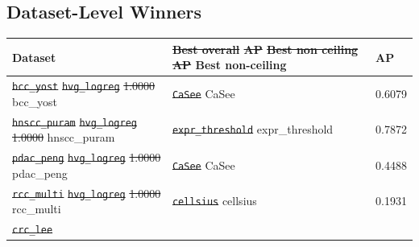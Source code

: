 \documentclass[10pt]{article}
\providecommand{\DIFaddtex}[1]{{\protect\color{trackgreen}#1}} %
\providecommand{\DIFdeltex}[1]{{\protect\color{red}\sout{#1}}}                      %
\providecommand{\DIFaddFL}[1]{\DIFadd{#1}} %
\providecommand{\DIFdelFL}[1]{\DIFdel{#1}} %
\providecommand{\DIFaddbeginFL}{} %
\providecommand{\DIFaddendFL}{} %
\providecommand{\DIFdelbeginFL}{} %
\providecommand{\DIFdelendFL}{} %
\providecommand{\DIFadd}[1]{\texorpdfstring{\DIFaddtex{#1}}{#1}} %
\providecommand{\DIFdel}[1]{\texorpdfstring{\DIFdeltex{#1}}{}} %
\newcommand{\DIFscaledelfig}{0.5}
\newlength{\DIFdelgraphicswidth} %
\newlength{\DIFdelgraphicsheight} %
\newcommand{\DIFaddincludegraphics}[2][]{{\color{trackgreen}\fbox{\DIFOincludegraphics[#1]{#2}}}} %
\newcommand{\DIFdelincludegraphics}[2][]{%
\sbox{\DIFdelgraphicsbox}{\DIFOincludegraphics[#1]{#2}}%
\settoboxwidth{\DIFdelgraphicswidth}{\DIFdelgraphicsbox} %
\settoboxtotalheight{\DIFdelgraphicsheight}{\DIFdelgraphicsbox} %
\scalebox{\DIFscaledelfig}{%
\parbox[b]{\DIFdelgraphicswidth}{\usebox{\DIFdelgraphicsbox}\\[-\baselineskip] \rule{\DIFdelgraphicswidth}{0em}}\llap{\resizebox{\DIFdelgraphicswidth}{\DIFdelgraphicsheight}{%
\setlength{\unitlength}{\DIFdelgraphicswidth}%
\begin{picture}(1,1)%
\thicklines\linethickness{2pt} %
{\color[rgb]{1,0,0}\put(0,0){\framebox(1,1){}}}%
{\color[rgb]{1,0,0}\put(0,0){\line( 1,1){1}}}%
{\color[rgb]{1,0,0}\put(0,1){\line(1,-1){1}}}%
\end{picture}%
}\hspace*{3pt}}} %
} %
\DeclareRobustCommand{\DIFaddbeginFL}{\DIFOaddbeginFL \let\includegraphics\DIFaddincludegraphics} %
\DeclareRobustCommand{\DIFaddendFL}{\DIFOaddendFL \let\includegraphics\DIFOincludegraphics} %
\DeclareRobustCommand{\DIFdelbeginFL}{\DIFOdelbeginFL \let\includegraphics\DIFdelincludegraphics} %
\DeclareRobustCommand{\DIFdelendFL}{\DIFOaddendFL \let\includegraphics\DIFOincludegraphics} %
\begin{document}
\begin{center}\DIFaddFL{\rule{0.5\linewidth}{0.5pt}}\end{center}

\subsection{\DIFaddFL{Dataset-Level Winners}}\label{dataset-level-winners}

\begin{longtable}[]{@{}lll@{}}
\DIFaddendFL \toprule\DIFaddbeginFL \noalign{}
\DIFaddendFL Dataset & \DIFdelbeginFL \DIFdelFL{Best overall }%
\DIFdelFL{AP }%
\DIFdelFL{Best non ceiling }%
\DIFdelFL{AP }\DIFdelendFL \DIFaddbeginFL \DIFaddFL{Best non-ceiling }& \DIFaddFL{AP }\DIFaddendFL \\
\midrule\DIFdelbeginFL \texttt{\DIFdelFL{bcc\_yost}}        %
\texttt{\DIFdelFL{hvg\_logreg}}     %
\DIFdelFL{1.0000 }\DIFdelendFL \DIFaddbeginFL \noalign{}
\endhead
\bottomrule\noalign{}
\endlastfoot
\DIFaddFL{bcc\_yost }\DIFaddendFL & \DIFdelbeginFL \texttt{\DIFdelFL{CaSee}}             %
\DIFdelendFL \DIFaddbeginFL \DIFaddFL{CaSee }\DIFaddendFL & 0.6079 \\
\DIFdelbeginFL \texttt{\DIFdelFL{hnscc\_puram}}     %
\texttt{\DIFdelFL{hvg\_logreg}}     %
\DIFdelFL{1.0000 }\DIFdelendFL \DIFaddbeginFL \DIFaddFL{hnscc\_puram }\DIFaddendFL & \DIFdelbeginFL \texttt{\DIFdelFL{expr\_threshold}}   %
\DIFdelendFL \DIFaddbeginFL \DIFaddFL{expr\_threshold }\DIFaddendFL & 0.7872 \\
\DIFdelbeginFL \texttt{\DIFdelFL{pdac\_peng}}       %
\texttt{\DIFdelFL{hvg\_logreg}}     %
\DIFdelFL{1.0000 }\DIFdelendFL \DIFaddbeginFL \DIFaddFL{pdac\_peng }\DIFaddendFL & \DIFdelbeginFL \texttt{\DIFdelFL{CaSee}}             %
\DIFdelendFL \DIFaddbeginFL \DIFaddFL{CaSee }\DIFaddendFL & 0.4488 \\
\DIFdelbeginFL \texttt{\DIFdelFL{rcc\_multi}}       %
\texttt{\DIFdelFL{hvg\_logreg}}     %
\DIFdelFL{1.0000 }\DIFdelendFL \DIFaddbeginFL \DIFaddFL{rcc\_multi }\DIFaddendFL & \DIFdelbeginFL \texttt{\DIFdelFL{cellsius}}          %
\DIFdelendFL \DIFaddbeginFL \DIFaddFL{cellsius }\DIFaddendFL & 0.1931 \\
\DIFdelbeginFL \texttt{\DIFdelFL{crc\_lee}}         %

\end{longtable}
\end{document}
